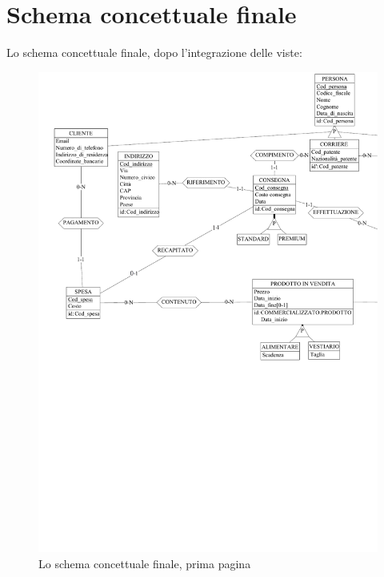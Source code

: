 \documentclass[a4paper,12pt]{report}
\begin{document}
\section{Schema concettuale finale}
Lo schema concettuale finale, dopo l'integrazione delle viste:
\begin{figure}[h]
	\centering{}
	\includegraphics{img/SchemaConcettuale-fin1.pdf}
	\caption{Lo schema concettuale finale, prima pagina}
\end{figure}
\end{document}
